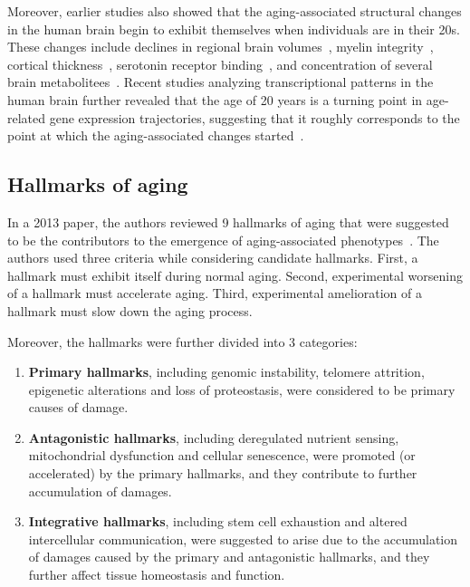 Moreover, earlier studies also showed that the aging-associated structural changes in the human brain begin to exhibit themselves when individuals are in their 20s.
These changes include declines in regional brain volumes~\autocite{Sowell2003}, myelin integrity~\autocite{Sullivan2006}, cortical thickness~\autocite{Salat2004, Magnotta1999},
serotonin receptor binding~\autocite{Sheline2002}, and concentration of several brain metabolitees~\autocite{Salthouse2009, Kadota2001}.
Recent studies analyzing transcriptional patterns in the human brain further revealed that the age of 20 years is a turning point in age-related gene expression trajectories,
suggesting that it roughly corresponds to the point at which the aging-associated changes started~\autocite{Somel2010, Colantuoni2011, Donertas2017}.

\subsection{Hallmarks of aging}
In a 2013 paper, the authors reviewed 9 hallmarks of aging that were suggested to be the contributors to the emergence of aging-associated phenotypes~\autocite{Lopez2013}.
The authors used three criteria while considering candidate hallmarks. 
First, a hallmark must exhibit itself during normal aging.
Second, experimental worsening of a hallmark must accelerate aging.
Third, experimental amelioration of a hallmark must slow down the aging process. 

Moreover, the hallmarks were further divided into 3 categories:
\begin{enumerate}
    \item \textbf{Primary hallmarks}, including genomic instability, telomere attrition, epigenetic alterations and loss of proteostasis,
    were considered to be primary causes of damage.
    \item \textbf{Antagonistic hallmarks}, including deregulated nutrient sensing, mitochondrial dysfunction and cellular senescence,
    were promoted (or accelerated) by the primary hallmarks, and they contribute to further accumulation of damages.
    \item \textbf{Integrative hallmarks}, including stem cell exhaustion and altered intercellular communication, 
    were suggested to arise due to the accumulation of damages caused by the primary and antagonistic hallmarks,
    and they further affect tissue homeostasis and function.
\end{enumerate}

